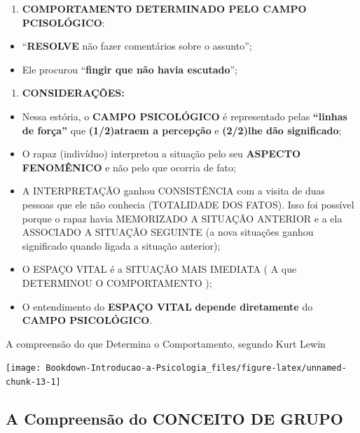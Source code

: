 \documentclass[
]{book}
\providecommand{\tightlist}{%
  \setlength{\itemsep}{0pt}\setlength{\parskip}{0pt}}
\begin{document}
\begin{enumerate}
\def\labelenumi{\arabic{enumi}.}
\setcounter{enumi}{1}
\tightlist
\item
  \textbf{COMPORTAMENTO DETERMINADO PELO CAMPO PCISOLÓGICO}:
\end{enumerate}

\begin{itemize}
\tightlist
\item
  ``\textbf{RESOLVE} não fazer comentários sobre o assunto'';
\item
  Ele procurou ``\textbf{fingir que não havia escutado}'';
\end{itemize}

\begin{enumerate}
\def\labelenumi{\arabic{enumi}.}
\setcounter{enumi}{2}
\tightlist
\item
  \textbf{CONSIDERAÇÕES:}
\end{enumerate}

\begin{itemize}
\tightlist
\item
  Nessa estória, o \textbf{CAMPO PSICOLÓGICO} é representado pelas \textbf{``linhas de força''} que \textbf{(1/2)atraem a percepção} e \textbf{(2/2)lhe dão significado};
\item
  O rapaz (indivíduo) interpretou a situação pelo seu \textbf{ASPECTO FENOMÊNICO} e não pelo que ocorria de fato;
\item
  A INTERPRETAÇÃO ganhou CONSISTÊNCIA com a visita de duas pessoas que ele não conhecia (TOTALIDADE DOS FATOS). Isso foi possível porque o rapaz havia MEMORIZADO A SITUAÇÃO ANTERIOR e a ela ASSOCIADO A SITUAÇÃO SEGUINTE (a nova situações ganhou significado quando ligada a situação anterior);
\item
  O ESPAÇO VITAL é a SITUAÇÃO MAIS IMEDIATA ( A que DETERMINOU O COMPORTAMENTO );
\item
  O entendimento do \textbf{ESPAÇO VITAL} \textbf{depende diretamente} do \textbf{CAMPO PSICOLÓGICO}.
\end{itemize}

A compreensão do que Determina o Comportamento, segundo Kurt Lewin

\texttt{[image: Bookdown-Introducao-a-Psicologia\_files/figure-latex/unnamed-chunk-13-1]}

\hypertarget{a-compreensuxe3o-do-conceito-de-grupo}{%
\subsection{A Compreensão do CONCEITO DE GRUPO}\label{a-compreensuxe3o-do-conceito-de-grupo}}
\end{document}
